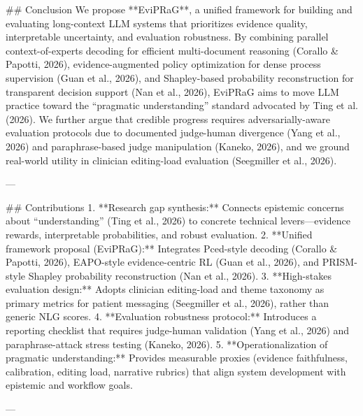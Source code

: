 ## Conclusion  
We propose **EviPRaG**, a unified framework for building and evaluating long-context LLM systems that prioritizes evidence quality, interpretable uncertainty, and evaluation robustness. By combining parallel context-of-experts decoding for efficient multi-document reasoning (Corallo & Papotti, 2026), evidence-augmented policy optimization for dense process supervision (Guan et al., 2026), and Shapley-based probability reconstruction for transparent decision support (Nan et al., 2026), EviPRaG aims to move LLM practice toward the “pragmatic understanding” standard advocated by Ting et al. (2026). We further argue that credible progress requires adversarially-aware evaluation protocols due to documented judge-human divergence (Yang et al., 2026) and paraphrase-based judge manipulation (Kaneko, 2026), and we ground real-world utility in clinician editing-load evaluation (Seegmiller et al., 2026).

---

## Contributions  
1. **Research gap synthesis:** Connects epistemic concerns about “understanding” (Ting et al., 2026) to concrete technical levers—evidence rewards, interpretable probabilities, and robust evaluation.  
2. **Unified framework proposal (EviPRaG):** Integrates Pced-style decoding (Corallo & Papotti, 2026), EAPO-style evidence-centric RL (Guan et al., 2026), and PRISM-style Shapley probability reconstruction (Nan et al., 2026).  
3. **High-stakes evaluation design:** Adopts clinician editing-load and theme taxonomy as primary metrics for patient messaging (Seegmiller et al., 2026), rather than generic NLG scores.  
4. **Evaluation robustness protocol:** Introduces a reporting checklist that requires judge-human validation (Yang et al., 2026) and paraphrase-attack stress testing (Kaneko, 2026).  
5. **Operationalization of pragmatic understanding:** Provides measurable proxies (evidence faithfulness, calibration, editing load, narrative rubrics) that align system development with epistemic and workflow goals.

---